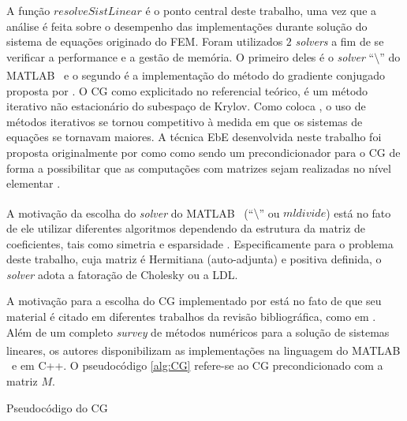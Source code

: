 \documentclass[
    12pt,               %
    openright,          %
    oneside,
    a4paper,            %
    english,            %
    french,             %
    spanish,            %
    brazil              %
    ]{abntex2}
\newcommand{\matlab}{MATLAB\textsuperscript{\textregistered} \ }
\begin{document}
A função $resolveSistLinear$ é o ponto central deste trabalho, uma vez que a análise é feita sobre o desempenho das implementações durante solução do sistema de equações originado do FEM. Foram utilizados $2$ \textit{solvers} a fim de se verificar a performance e a gestão de memória. O primeiro deles é o \textit{solver} ``$\setminus$'' do \matlab e o segundo é a implementação do método do gradiente conjugado proposta por . O CG como explicitado no referencial teórico, é um método iterativo não estacionário do subespaço de Krylov. Como coloca , o uso de métodos iterativos se tornou competitivo à medida em que os sistemas de equações se tornavam maiores. A técnica EbE desenvolvida neste trabalho foi proposta originalmente por  como como sendo um precondicionador para o CG de forma a possibilitar que as computações com matrizes sejam realizadas no nível elementar \cite{Kiss2012}.

A motivação da escolha do \textit{solver} do \matlab (``$\setminus$'' ou $mldivide$) está no fato de ele utilizar diferentes algoritmos dependendo da estrutura da matriz de coeficientes, tais como simetria e esparsidade \nocite{matMldivide}. Especificamente para o problema deste trabalho, cuja matriz é Hermitiana (auto-adjunta) e positiva definida, o \textit{solver} adota a fatoração de Cholesky ou a LDL.

A motivação para a escolha do CG implementado por  está no fato de que seu material é citado em diferentes trabalhos da revisão bibliográfica, como em . Além de um completo \textit{survey} de métodos numéricos para a solução de sistemas lineares, os autores disponibilizam as implementações na linguagem do \matlab e em C++. O pseudocódigo \ref{alg:CG} refere-se ao CG precondicionado com a matriz $M$.

\begin{algorithm}	
	\caption{\label{alg:CG}Pseudocódigo do CG} 
	\begin{algorithmic}[1]
				\Else
			\EndIf	
			\EndIf
		\EndFor
	\end{algorithmic}
\end{algorithm}
\end{document}
